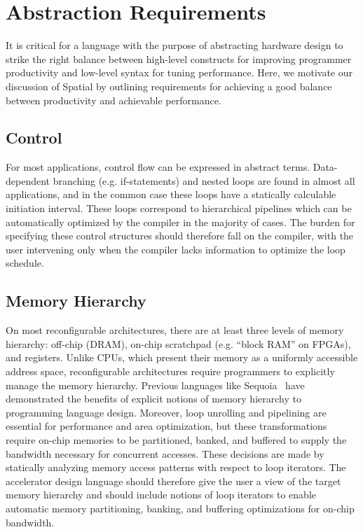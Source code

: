 \section{Abstraction Requirements}
\label{requirements}
It is critical for a language with the purpose of abstracting hardware design to strike the right
balance between high-level constructs for improving programmer productivity and low-level syntax for tuning performance. Here, we motivate our discussion of Spatial by outlining requirements for achieving a good balance between productivity and achievable performance.

\subsection{Control}
For most applications, control flow can be expressed in abstract terms. Data-dependent branching (e.g. if-statements)
and nested loops are found in almost all applications, and in the common case these loops have a statically calculable
initiation interval. These loops correspond to hierarchical pipelines which can be automatically optimized by the
compiler in the majority of cases. The burden for specifying these control structures should therefore fall on the
compiler, with the user intervening only when the compiler lacks information to optimize the loop schedule.

\subsection{Memory Hierarchy}
On most reconfigurable architectures, there are at least three levels of memory hierarchy: off-chip (DRAM),
on-chip scratchpad (e.g. ``block RAM'' on FPGAs), and registers.
Unlike CPUs, which present their memory as a uniformly accessible address space,
reconfigurable architectures require programmers to explicitly manage the memory hierarchy.
Previous languages like Sequoia~\cite{sequoia} have demonstrated the benefits of explicit notions of memory hierarchy
to programming language design. Moreover, loop unrolling and pipelining are essential for performance and area optimization, but these transformations
require on-chip memories to be partitioned, banked, and buffered to supply the bandwidth necessary for concurrent accesses.
These decisions are made by statically analyzing memory access patterns with respect to loop iterators.
The accelerator design language should therefore give the user a view of the target memory
hierarchy and should include notions of loop iterators to enable automatic memory partitioning, banking, and buffering optimizations for on-chip bandwidth.

